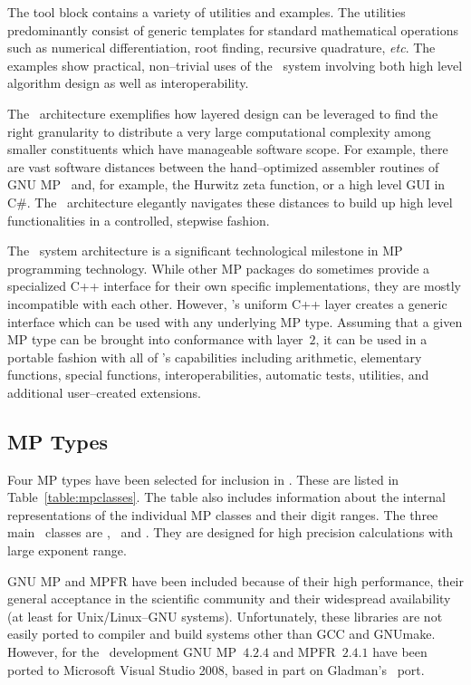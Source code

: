 The tool block contains a variety of utilities and examples.
The utilities predominantly consist of generic templates
for standard mathematical operations such as numerical differentiation,
root finding, recursive quadrature, {\emph{etc}}.
The examples show practical, non--trivial
uses of the \efloat\ system involving both high level algorithm design
as well as interoperability.

The \efloat\ architecture exemplifies how layered
design can be leveraged to find the right granularity to distribute
a very large computational complexity among smaller constituents
which have manageable software scope.
For example, there are vast software distances
between the hand--optimized assembler routines of
GNU MP~\cite{gmp:website} and, for example, the Hurwitz zeta function,
or a high level GUI in C\#.
The \efloat\ architecture elegantly navigates
these distances to build up high level functionalities in
a controlled, stepwise fashion.

The \efloat\ system architecture is a significant technological
milestone in MP programming technology. While other MP packages do sometimes
provide a specialized C++ interface for their own specific implementations,
they are mostly incompatible with each other.
However, \efloat 's uniform C++ layer creates a
generic interface which can be used with any underlying MP type.
Assuming that a given MP type can be brought into conformance with layer~$2$,
it can be used in a portable fashion with all of \efloat 's capabilities
including arithmetic, elementary functions, special functions, interoperabilities,
automatic tests, utilities, and additional user--created extensions.

\pagebreak

\subsection{MP Types}



Four MP types have been selected for inclusion in \efloat.
These are listed in Table~\ref{table:mpclasses}.
The table also includes information about the internal
representations of the individual MP classes and
their digit ranges.
The three main \efloatclass\ classes are
\efxefloatclass, \mpfrefloatclass\ and \gmpefloatclass.
They are designed for high precision calculations with large
exponent range.

GNU MP and MPFR have been included
because of their high performance, their general acceptance
in the scientific community and their widespread availability
(at least for Unix/Linux--GNU systems). Unfortunately,
these libraries are not easily ported to compiler and
build systems other than GCC and GNU\-make.
However, for the \efloat\ development GNU MP~$4$.$2$.$4$
and MPFR~$2$.$4$.$1$ have been ported to
Microsoft{\footnotesize {\textregistered}}
Visual Studio{\footnotesize {\textregistered}} 2008,
based in part on Glad\-man's~\cite{gladman:ports} port.

